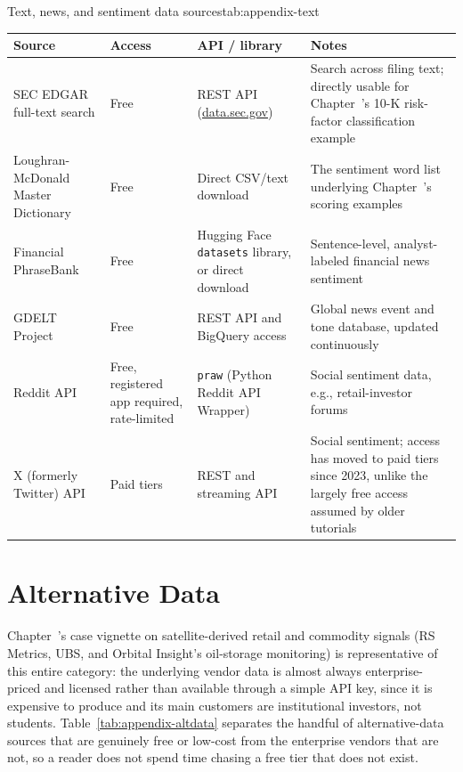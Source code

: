\documentclass[../ai_in_finance]{subfiles}
\begin{document}
\begin{booktable}[htbp]{Text, news, and sentiment data sources}{tab:appendix-text}
\begin{tabular}{L{3.4cm}L{2.2cm}L{3.6cm}L{3.4cm}}
\toprule
Source & Access & API / library & Notes \\
\midrule
SEC EDGAR full-text search & Free & REST API (\url{data.sec.gov}) & Search across filing text; directly usable for Chapter~'s 10-K risk-factor classification example \\
Loughran-McDonald Master Dictionary & Free & Direct CSV/text download & The sentiment word list underlying Chapter~'s scoring examples \\
Financial PhraseBank & Free & Hugging Face \texttt{datasets} library, or direct download & Sentence-level, analyst-labeled financial news sentiment \\
GDELT Project & Free & REST API and BigQuery access & Global news event and tone database, updated continuously \\
Reddit API & Free, registered app required, rate-limited & \texttt{praw} (Python Reddit API Wrapper) & Social sentiment data, e.g., retail-investor forums \\
X (formerly Twitter) API & Paid tiers & REST and streaming API & Social sentiment; access has moved to paid tiers since 2023, unlike the largely free access assumed by older tutorials \\
\bottomrule
\end{tabular}
\end{booktable}

\section{Alternative Data}

Chapter~'s case vignette on satellite-derived retail and commodity signals (RS Metrics, UBS, and Orbital Insight's oil-storage monitoring) is representative of this entire category: the underlying vendor data is almost always enterprise-priced and licensed rather than available through a simple API key, since it is expensive to produce and its main customers are institutional investors, not students. Table~\ref{tab:appendix-altdata} separates the handful of alternative-data sources that are genuinely free or low-cost from the enterprise vendors that are not, so a reader does not spend time chasing a free tier that does not exist.
\end{document}
